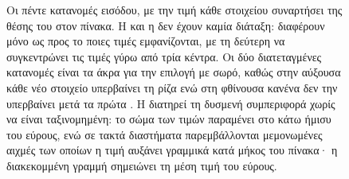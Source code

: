 \begin{figure}[H]
    \caption[Οι πέντε κατανομές εισόδου]{Οι πέντε κατανομές εισόδου, με την τιμή κάθε στοιχείου συναρτήσει της
    θέσης του στον πίνακα. Η  και η  δεν έχουν καμία
    διάταξη: διαφέρουν μόνο ως προς το ποιες τιμές εμφανίζονται, με τη δεύτερη να
    συγκεντρώνει τις τιμές γύρω από τρία κέντρα. Οι δύο διατεταγμένες κατανομές
    είναι τα άκρα για την επιλογή με σωρό, καθώς στην αύξουσα κάθε νέο στοιχείο
    υπερβαίνει τη ρίζα ενώ στη φθίνουσα κανένα δεν την υπερβαίνει μετά τα πρώτα
    . Η  διατηρεί τη δυσμενή συμπεριφορά χωρίς να είναι
    ταξινομημένη: το σώμα των τιμών παραμένει στο κάτω ήμισυ του εύρους, ενώ σε
    τακτά διαστήματα παρεμβάλλονται μεμονωμένες αιχμές των οποίων η τιμή αυξάνει
    γραμμικά κατά μήκος του πίνακα· η διακεκομμένη γραμμή σημειώνει τη μέση τιμή
    του εύρους.}
    \label{fig:meth-dists}
\end{figure}
